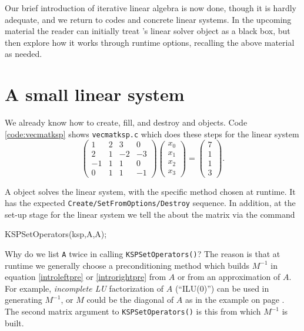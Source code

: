 Our brief introduction of iterative linear algebra is now done, though it is hardly adequate, and we return to \PETSc codes and concrete linear systems.  In the upcoming material the reader can initially treat \PETSc's \pKSP linear solver object as a black box, but then explore how it works through runtime options, recalling the above material as needed.


\section{A small linear system}

We already know how to create, fill, and destroy \pVec and \pMat objects.  Code \ref{code:vecmatksp} shows \texttt{vecmatksp.c} which does these steps for the linear system
\begin{equation}
\begin{pmatrix} 1 & 2 & 3 & 0 \\
                2 & 1 &-2 &-3 \\
               -1 & 1 & 1 & 0 \\
                0 & 1 & 1 &-1 \end{pmatrix}
\begin{pmatrix} x_0 \\ x_1 \\ x_2 \\ x_3 \end{pmatrix}
=
\begin{pmatrix} 7 \\ 1 \\ 1 \\ 3 \end{pmatrix}.
\end{equation}

A \pKSP object solves the linear system, with the specific method chosen at runtime.  It has the expected \texttt{Create/SetFromOptions/Destroy} sequence.  In addition, at the set-up stage for the linear system we tell the \pKSP about the matrix via the command
\begin{code}
KSPSetOperators(ksp,A,A);
\end{code}
Why do we list \texttt{A} twice in calling \texttt{KSPSetOperators()}?  The reason is that at runtime we generally choose a preconditioning method which builds $M^{-1}$ in equation \eqref{introleftpre} or \eqref{introrightpre} from $A$ or from an approximation of $A$.  For example, \emph{incomplete LU} factorization of $A$ (``ILU($0$)'') can be used in generating $M^{-1}$, or $M$ could be the diagonal of $A$ as in the example on page \pageref{example:ls:jacobirichardson}.  The second matrix argument to \texttt{KSPSetOperators()} is this \pMat from which $M^{-1}$ is built.

